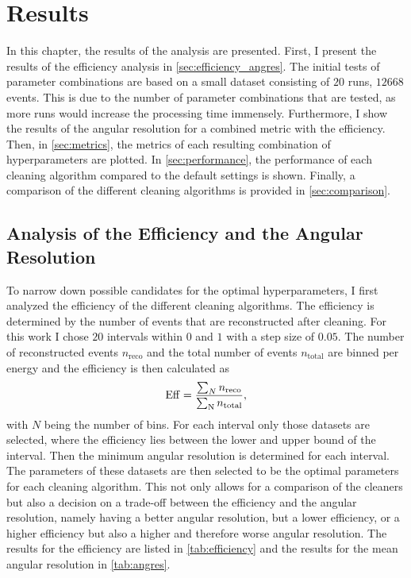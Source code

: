 \chapter{Results}
\label{ch:results}

In this chapter, the results of the analysis are presented. First, I present the results of the
efficiency analysis in \autoref{sec:efficiency_angres}. The initial tests of parameter combinations
are based on a small dataset consisting of \(\num{20}\) runs, \ie \(\num{12668}\) events. This is
due to the number of parameter combinations that are tested, as more runs would increase the
processing time immensely. Furthermore, I show the results of the angular resolution for a combined
metric with the efficiency. Then, in \autoref{sec:metrics}, the metrics of each resulting combination
of hyperparameters are plotted. In \autoref{sec:performance}, the performance of each cleaning
algorithm compared to the default settings is shown. Finally, a comparison of the different
cleaning algorithms is provided in \autoref{sec:comparison}.


\section{Analysis of the Efficiency and the Angular Resolution}
\label{sec:efficiency_angres}

To narrow down possible candidates for the optimal hyperparameters, I first analyzed the efficiency
of the different cleaning algorithms. The efficiency is determined by the number of events that are
reconstructed after cleaning. For this work I chose \(\num{20}\) intervals within \(\num{0}\) and
\(\num{1}\) with a step size of \(\num{0.05}\). The number of reconstructed events \(n_{\mathrm{reco}}\)
and the total number of events \(n_{\mathrm{total}}\) are binned per energy and the efficiency is then
calculated as
\begin{equation}\label{eq:efficiency_sum}
    \operatorname{Eff} = \frac{\sum_{N} n_{\mathrm{reco}}}{\sum_{\mathrm{N}} n_{\mathrm{total}}},
\end{equation}
with \(N\) being the number of bins. For each interval only those datasets are selected, where the efficiency
lies between the lower and upper bound of the interval. Then the minimum angular resolution is
determined for each interval. The parameters of these datasets are then selected to be the optimal
parameters for each cleaning algorithm. This not only allows for a comparison of the cleaners but also
a decision on a trade-off between the efficiency and the angular resolution, namely having a better
angular resolution, but a lower efficiency, or a higher efficiency but also a higher and therefore worse
angular resolution. The results for the efficiency are listed in \autoref{tab:efficiency} and
the results for the mean angular resolution in \autoref{tab:angres}.

